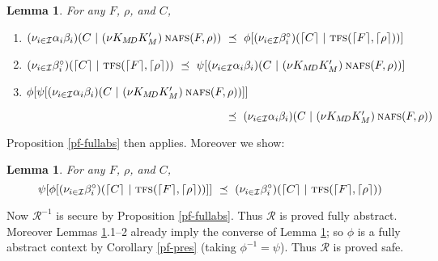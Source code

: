 \documentclass[10pt]{article}
\newtheorem{lemma}[theorem]{Lemma}
\newcommand{\new}[2]{(\nu #1)\:#2}
\newcommand{\betac}{\beta^\circ}
\begin{document}
\begin{lemma}\label{static-lemma} For any $F$, $\rho$, and $C$,
\begin{enumerate}
\item $(\nu_{i \in \mathcal I}\alpha_i\beta_i)(C~|~\new{K_{M\!D}K'_M}\textsc{nafs}(F,\rho)) ~\preceq~ \phi[(\nu_{i \in \mathcal I}\betac_i)(\lceil C\rceil~|~\textsc{tfs}(\lceil F\rceil,\lceil \rho\rceil))] $
\item $(\nu_{i \in \mathcal I}\betac_i)(\lceil C\rceil~|~\textsc{tfs}(\lceil F\rceil,\lceil \rho\rceil)) ~\preceq ~ \psi[(\nu_{i \in \mathcal I}\alpha_i\beta_i)(C~|~\new{K_{M\!D}K'_M}\textsc{nafs}(F,\rho))] $
\item $\phi[\psi[(\nu_{i \in \mathcal I}\alpha_i\beta_i)(C~|~\new{K_{M\!D}K'_M}\textsc{nafs}(F,\rho))]] $
\par $~~~~~~~~~~~~~~~~~~~~~~~~~~~~~~~~~~~~~~~~~~~~~~~~~~~~~~~\preceq ~ (\nu_{i \in \mathcal I}\alpha_i\beta_i)(C~|~\new{K_{M\!D}K'_M}\textsc{nafs}(F,\rho))$
\end{enumerate}
\end{lemma}
Proposition \ref{pf-fullabs} then applies. Moreover we show:
\begin{lemma}\label{static-safetylemma} For any $F$, $\rho$, and $C$, 
$$\psi[\phi[(\nu_{i \in \mathcal I}\betac_i)(\lceil C\rceil~|~\textsc{tfs}(\lceil F\rceil,\lceil \rho\rceil))]] ~\preceq ~ (\nu_{i \in \mathcal I}\betac_i)(\lceil C\rceil~|~\textsc{tfs}(\lceil F\rceil,\lceil \rho\rceil))$$
\end{lemma}
Now $\mathcal R^{-1}$ is secure by Proposition \ref{pf-fullabs}. Thus $\mathcal R$ is proved fully abstract. Moreover Lemmas \ref{static-lemma}.1--2 already imply the converse of Lemma \ref{static-safetylemma}; so $\phi$ is a fully abstract context by Corollary \ref{pf-pres} (taking $\phi^{-1} = \psi$). Thus $\mathcal R$ is proved safe. 
\end{document}
